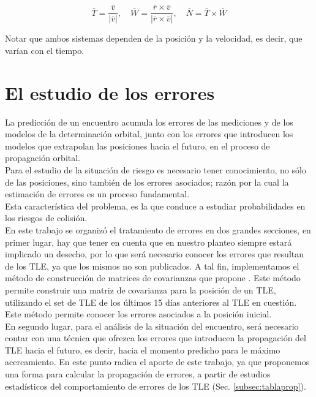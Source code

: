 {\begin{equation}
 \bar{T}=\frac{\bar{v}}{|\bar{v}|}, \quad \bar{W}=\frac{\bar{r}\times\bar{v}}{|\bar{r}\times\bar{v}|}, \quad \bar{N}=\bar{T}\times\bar{W}
\end{equation}



Notar que ambos sistemas dependen de la posici\'on y la velocidad, es decir, que var\'ian con el tiempo.\\





\section{El estudio de los errores}

La predicci\'on de un encuentro acumula los errores de las mediciones y de los modelos de la  determinaci\'on orbital, junto con los errores que introducen los modelos que extrapolan las posiciones hacia el futuro, en el proceso de propagaci\'on orbital.\\
Para el estudio de la situaci\'on de riesgo es necesario tener conocimiento, no s\'olo de las posiciones, sino tambi\'en de los errores asociados; raz\'on por la cual la estimaci\'on de errores es un proceso fundamental.\\ 
Esta caracter\'istica del problema, es la que conduce a estudiar probabilidades en los riesgos de colisi\'on.\\

En este trabajo se organiz\'o el tratamiento de errores en dos grandes secciones, en primer lugar, hay que tener en cuenta que en nuestro planteo siempre estar\'a implicado un desecho, por lo que ser\'a necesario conocer los errores que resultan de los TLE, ya que los mismos no son publicados. A tal fin, implementamos el m\'etodo de construcci\'on de matrices de covarianzas que propone \cite{osweiler}. Este m\'etodo permite construir una matriz de covarianza para la posici\'on de un TLE, utilizando el set de TLE de los \'ultimos 15 d\'ias anteriores al TLE en cuesti\'on. Este m\'etodo permite conocer los errores asociados a la posici\'on inicial.\\

En segundo lugar, para el an\'alisis de la situaci\'on del encuentro, ser\'a necesario contar con una t\'ecnica que ofrezca los errores que introducen la propagaci\'on del TLE hacia el futuro, es decir, hacia el momento predicho para le m\'aximo acercamiento. En este punto radica el aporte de este trabajo, ya que proponemos una forma para calcular la propagaci\'on de errores, a partir de estudios estad\'isticos del comportamiento de errores de los TLE (Sec. \ref{subsec:tablaprop}).\\

}
